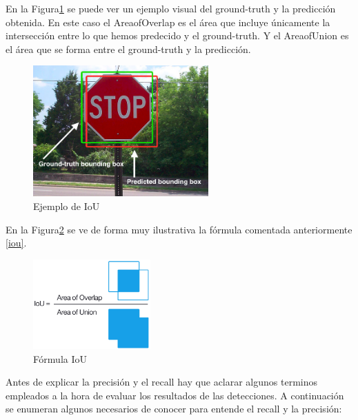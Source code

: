 En la Figura\ref{fig.ejemplo_iou} se puede ver un ejemplo visual del ground-truth y la predicción obtenida. En este caso el AreaofOverlap es el área que incluye únicamente la intersección entre lo que hemos predecido y el ground-truth. Y el AreaofUnion es el área que se forma entre el ground-truth y la predicción.

\begin{figure}[H]
  \begin{center}
    \includegraphics[width=0.6\textwidth]{figures/Herramientas/iou.png}
		\caption{Ejemplo de IoU}
		\label{fig.ejemplo_iou}
		\end{center}
\end{figure}

En la Figura\ref{fig.formula_iou} se ve de forma muy ilustrativa la fórmula comentada anteriormente \ref{iou}.

\begin{figure}[H]
  \begin{center}
    \includegraphics[width=0.4\textwidth]{figures/Herramientas/iou_formula.png}
		\caption{Fórmula IoU}
		\label{fig.formula_iou}
		\end{center}
\end{figure}

Antes de explicar la precisión y el recall hay que aclarar algunos terminos empleados a la hora de evaluar los resultados de las detecciones. A continuación se enumeran algunos necesarios de conocer para entende el recall y la precisión:

